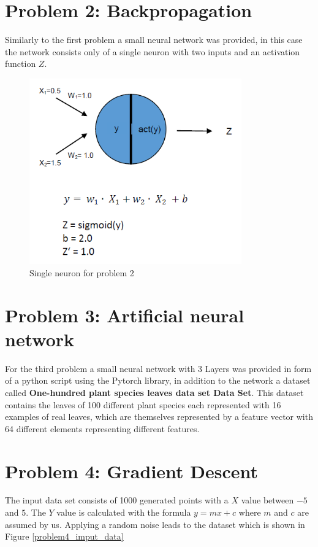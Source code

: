 \section{Problem 2: Backpropagation}
Similarly to the first problem a small neural network was provided, in this case the network consists only of a single neuron with two inputs and an activation function $Z$.
\begin{figure}[h]
	\centering
	\includegraphics[height=8cm]{img/nn_task2.png}
	\caption{Single neuron for problem 2}
    \label{nn_task1}
\end{figure}

\section{Problem 3: Artificial neural network}
For the third problem a small neural network with 3 Layers was provided in form of a python script using the Pytorch library, in addition to the network a dataset called \textbf{One-hundred plant species leaves data set Data Set}. This dataset contains the leaves of 100 different plant species each represented with 16 examples of real leaves, which are themselves represented by a feature vector with 64 different elements representing different features.

\section{Problem 4: Gradient Descent}

The input data set consists of 1000 generated points with a $X$ value between $-5$ and $5$.
The $Y$ value is calculated with the formula $ y = mx + c $ where $m$ and $c$ are assumed by us.
Applying a random noise leads to the dataset which is shown in Figure \ref{problem4_imput_data}

